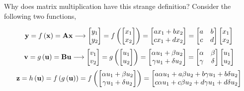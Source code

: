 \documentclass[aspectratio=169]{beamer}
\begin{document}
\begin{frame}[t]{Why does matrix multiplication have this strange definition?}
  Consider the following two functions,
  \begin{small}
    \[ \mathbf{y} = f\left(\mathbf{x}\right) = \mathbf{A}\mathbf{x} \longrightarrow \begin{bmatrix}y_1 \\ y_2\end{bmatrix} = f\left(\begin{bmatrix}x_1 \\ x_2\end{bmatrix}\right) = \begin{bmatrix}ax_1 + bx_2 \\ cx_1 + dx_2\end{bmatrix} = \begin{bmatrix}a & b \\ c & d\end{bmatrix}\begin{bmatrix}x_1 \\ x_2\end{bmatrix}\]
    \[ \mathbf{v} = g\left(\mathbf{u}\right) = \mathbf{B}\mathbf{u} \longrightarrow \begin{bmatrix}v_1 \\ v_2\end{bmatrix} = g\left(\begin{bmatrix}u_1 \\ u_2\end{bmatrix}\right) = \begin{bmatrix}\alpha u_1 + \beta u_2 \\ \gamma u_1 + \delta u_2\end{bmatrix} = \begin{bmatrix}\alpha & \beta \\ \gamma & \delta\end{bmatrix}\begin{bmatrix}u_1 \\ u_2\end{bmatrix}\]
    \[ \begin{split}
      \mf{z} = h\left(\mf{u}\right) &= f\left(g\left(\mf{u}\right)\right) = f\left(\begin{bmatrix}\alpha u_1 + \beta u_2 \\ \gamma u_1 + \delta u_2\end{bmatrix}\right) = \begin{bmatrix}a\alpha u_1 + a\beta u_2 + b\gamma u_1 + b\delta u_2 \\ c\alpha u_1 + c\beta u_2 + d\gamma u_1 + d\delta u_2 \end{bmatrix}\\

\end{split}\]
\end{small}
\end{frame}
\end{document}
